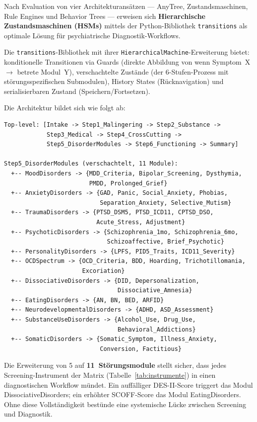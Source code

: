 \documentclass[11pt,a4paper]{article}
\begin{document}
Nach Evaluation von vier Architekturans\"atzen --- AnyTree, Zustandsmaschinen, Rule Engines und Behavior Trees --- erweisen sich \textbf{Hierarchische Zustandsmaschinen (HSMs)} mittels der Python-Bibliothek \texttt{transitions} als optimale L\"osung f\"ur psychiatrische Diagnostik-Workflows.

Die \texttt{transitions}-Bibliothek mit ihrer \texttt{HierarchicalMachine}-Erweiterung bietet: konditionelle Transitionen via Guards (direkte Abbildung von \glqq wenn Symptom~X $\to$ betrete Modul~Y\grqq{}), verschachtelte Zust\"ande (der 6-Stufen-Prozess mit st\"orungsspezifischen Submodulen), History States (R\"ucknavigation) und serialisierbaren Zustand (Speichern/Fortsetzen).

Die Architektur bildet sich wie folgt ab:

\begin{verbatim}
Top-level: [Intake -> Step1_Malingering -> Step2_Substance ->
            Step3_Medical -> Step4_CrossCutting ->
            Step5_DisorderModules -> Step6_Functioning -> Summary]

Step5_DisorderModules (verschachtelt, 11 Module):
  +-- MoodDisorders -> {MDD_Criteria, Bipolar_Screening, Dysthymia,
                        PMDD, Prolonged_Grief}
  +-- AnxietyDisorders -> {GAD, Panic, Social_Anxiety, Phobias,
                           Separation_Anxiety, Selective_Mutism}
  +-- TraumaDisorders -> {PTSD_DSM5, PTSD_ICD11, CPTSD_DSO,
                          Acute_Stress, Adjustment}
  +-- PsychoticDisorders -> {Schizophrenia_1mo, Schizophrenia_6mo,
                             Schizoaffective, Brief_Psychotic}
  +-- PersonalityDisorders -> {LPFS, PID5_Traits, ICD11_Severity}
  +-- OCDSpectrum -> {OCD_Criteria, BDD, Hoarding, Trichotillomania,
                      Excoriation}
  +-- DissociativeDisorders -> {DID, Depersonalization,
                                Dissociative_Amnesia}
  +-- EatingDisorders -> {AN, BN, BED, ARFID}
  +-- NeurodevelopmentalDisorders -> {ADHD, ASD_Assessment}
  +-- SubstanceUseDisorders -> {Alcohol_Use, Drug_Use,
                                Behavioral_Addictions}
  +-- SomaticDisorders -> {Somatic_Symptom, Illness_Anxiety,
                           Conversion, Factitious}
\end{verbatim}

Die Erweiterung von 5 auf \textbf{11~St\"orungsmodule} stellt sicher, dass jedes Screening-Instrument der Matrix (Tabelle~\ref{tab:instrumente}) in einen diagnostischen Workflow m\"undet. Ein auff\"alliger DES-II-Score triggert das Modul DissociativeDisorders; ein erh\"ohter SCOFF-Score das Modul EatingDisorders. Ohne diese Vollst\"andigkeit best\"unde eine systemische L\"ucke zwischen Screening und Diagnostik.
\end{document}
